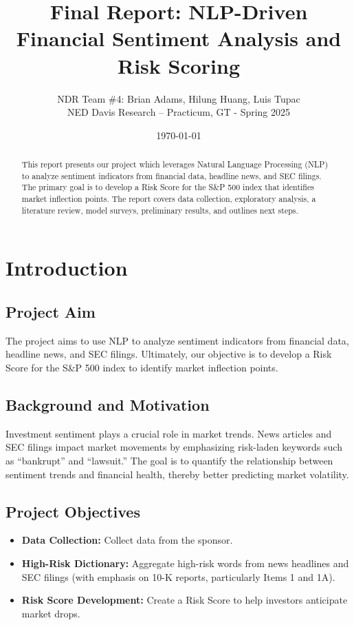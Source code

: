 \documentclass[twocolumn]{article}
\title{Final Report: NLP-Driven Financial Sentiment Analysis and Risk Scoring}
\author{NDR Team \#4: Brian Adams, Hilung Huang, Luis Tupac\\NED Davis Research – Practicum, GT - Spring 2025}
\date{\today}
\begin{document}
\maketitle

\begin{abstract}
This report presents our project which leverages Natural Language Processing (NLP) to analyze sentiment indicators from financial data, headline news, and SEC filings. The primary goal is to develop a Risk Score for the S\&P 500 index that identifies market inflection points. The report covers data collection, exploratory analysis, a literature review, model surveys, preliminary results, and outlines next steps.
\end{abstract}

\section{Introduction}
\subsection{Project Aim}
The project aims to use NLP to analyze sentiment indicators from financial data, headline news, and SEC filings. Ultimately, our objective is to develop a Risk Score for the S\&P 500 index to identify market inflection points.

\subsection{Background and Motivation}
Investment sentiment plays a crucial role in market trends. News articles and SEC filings impact market movements by emphasizing risk-laden keywords such as ``bankrupt'' and ``lawsuit.'' The goal is to quantify the relationship between sentiment trends and financial health, thereby better predicting market volatility.

\subsection{Project Objectives}
\begin{itemize}
    \item \textbf{Data Collection:} Collect data from the sponsor.
    \item \textbf{High-Risk Dictionary:} Aggregate high-risk words from news headlines and SEC filings (with emphasis on 10-K reports, particularly Items 1 and 1A).
    \item \textbf{Risk Score Development:} Create a Risk Score to help investors anticipate market drops.
\end{itemize}
\end{document}
